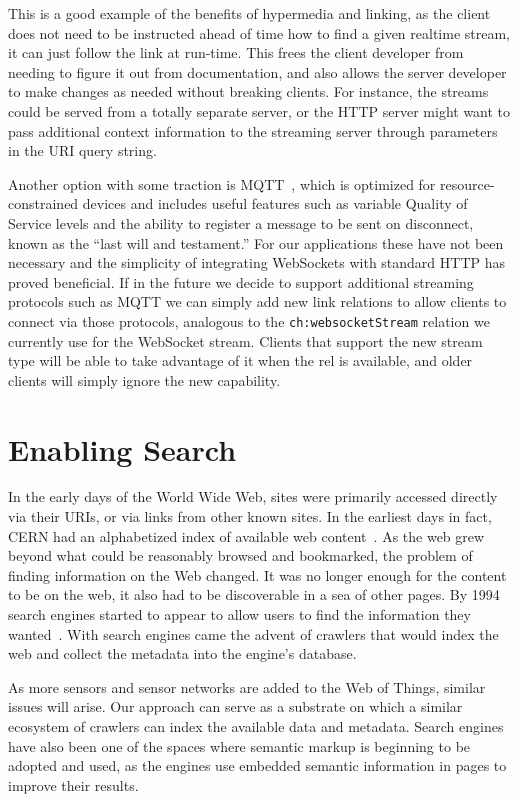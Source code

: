 \documentclass{acm_proc_article-sp}
\begin{document}
This is a good example of the benefits of hypermedia and linking, as the client
does not need to be instructed ahead of time how to find a given realtime
stream, it can just follow the link at run-time. This frees the client
developer from needing to figure it out from documentation, and also allows the
server developer to make changes as needed without breaking clients. For
instance, the streams could be served from a totally separate server, or the
HTTP server might want to pass additional context information to the streaming
server through parameters in the URI query string.

Another option with some traction is MQTT~\cite{collina2012}, which is
optimized for resource-constrained devices and includes useful features such as
variable Quality of Service levels and the ability to register a message to be
sent on disconnect, known as the ``last will and testament.'' For our
applications these have not been necessary and the simplicity of integrating
WebSockets with standard HTTP has proved beneficial. If in the future we decide
to support additional streaming protocols such as MQTT we can simply add new
link relations to allow clients to connect via those protocols, analogous to
the \texttt{ch:websocketStream} relation we currently use for the WebSocket
stream. Clients that support the new stream type will be able to take advantage
of it when the rel is available, and older clients will simply ignore the new
capability.

\section{Enabling Search}
\label{search}

In the early days of the World Wide Web, sites were primarily accessed directly
via their URIs, or via links from other known sites. In the earliest days in
fact, CERN had an alphabetized index of available web
content~\cite{websearchengines}. As the web grew beyond what could be
reasonably browsed and bookmarked, the problem of finding information on the
Web changed. It was no longer enough for the content to be on the web, it also
had to be discoverable in a sea of other pages. By 1994 search engines started
to appear to allow users to find the information they
wanted~\cite{websearchengines}. With search engines came the advent of crawlers
that would index the web and collect the metadata into the engine's database.

As more sensors and sensor networks are added to the Web of Things, similar
issues will arise. Our approach can serve as a substrate on which a similar
ecosystem of crawlers can index the available data and metadata. Search engines
have also been one of the spaces where semantic markup is beginning to be
adopted and used,  as the engines use embedded semantic information in pages to
improve their results.
\end{document}
